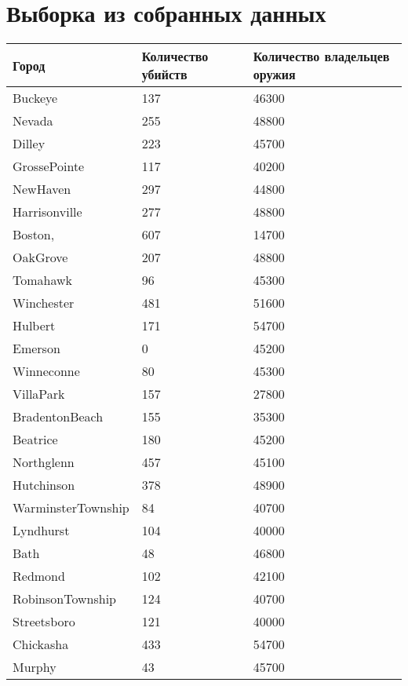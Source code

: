 \documentclass[titlepage]{article}
\begin{document}
\section{Выборка из собранных данных}
\label{sec:appendix}
\begin{table}[!ht]
    \centering
    \begin{tabular}{|l|l|l|}
    \hline
        Город & Количество убийств & Количество владельцев оружия \\ \hline
        Buckeye & 137 & 46300 \\ \hline
        Nevada & 255 & 48800 \\ \hline
        Dilley & 223 & 45700 \\ \hline
        GrossePointe & 117 & 40200 \\ \hline
        NewHaven & 297 & 44800 \\ \hline
        Harrisonville & 277 & 48800 \\ \hline
        Boston, & 607 & 14700 \\ \hline
        OakGrove & 207 & 48800 \\ \hline
        Tomahawk & 96 & 45300 \\ \hline
        Winchester & 481 & 51600 \\ \hline
        Hulbert & 171 & 54700 \\ \hline
        Emerson & 0 & 45200 \\ \hline
        Winneconne & 80 & 45300 \\ \hline
        VillaPark & 157 & 27800 \\ \hline
        BradentonBeach & 155 & 35300 \\ \hline
        Beatrice & 180 & 45200 \\ \hline
        Northglenn & 457 & 45100 \\ \hline
        Hutchinson & 378 & 48900 \\ \hline
        WarminsterTownship & 84 & 40700 \\ \hline
        Lyndhurst & 104 & 40000 \\ \hline
        Bath & 48 & 46800 \\ \hline
        Redmond & 102 & 42100 \\ \hline
        RobinsonTownship & 124 & 40700 \\ \hline
        Streetsboro & 121 & 40000 \\ \hline
        Chickasha & 433 & 54700 \\ \hline
        Murphy & 43 & 45700 \\ \hline

\end{tabular}
\end{table}
\end{document}
